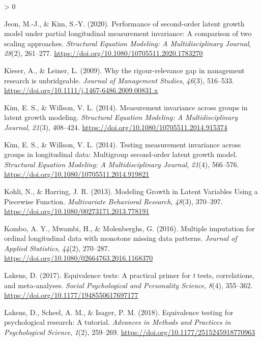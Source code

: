 \documentclass[
12pt, %
twoside,
english]{guelphthesis}
\newlength{\cslhangindent}
\newenvironment{CSLReferences}[2] %
 {%
  \setlength{\parindent}{0pt}
  \ifodd #1 \everypar{\setlength{\hangindent}{\cslhangindent}}\ignorespaces\fi
  \ifnum #2 > 0
  \setlength{\parskip}{\linespacing{2}}
  \fi
 }%
 {}
\begin{document}
\begin{CSLReferences}{1}{0}
\leavevmode{}%
Jeon, M.-J., \& Kim, S.-Y. (2020). Performance of second-order latent growth model under partial longitudinal measurement invariance: A comparison of two scaling approaches. \emph{Structural Equation Modeling: A Multidisciplinary Journal}, \emph{28}(2), 261--277. \url{https://doi.org/10.1080/10705511.2020.1783270}

\leavevmode{}%
Kieser, A., \& Leiner, L. (2009). Why the rigour-relevance gap in nanagement research is unbridgeable. \emph{Journal of Management Studies}, \emph{46}(3), 516--533. \url{https://doi.org/10.1111/j.1467-6486.2009.00831.x}

\leavevmode{}%
Kim, E. S., \& Willson, V. L. (2014). Measurement invariance across groups in latent growth modeling. \emph{Structural Equation Modeling: A Multidisciplinary Journal}, \emph{21}(3), 408--424. \url{https://doi.org/10.1080/10705511.2014.915374}

\leavevmode{}%
Kim, E. S., \& Willson, V. L. (2014). Testing measurement invariance across groups in longitudinal data: Multigroup second-order latent growth model. \emph{Structural Equation Modeling: A Multidisciplinary Journal}, \emph{21}(4), 566--576. \url{https://doi.org/10.1080/10705511.2014.919821}

\leavevmode{}%
Kohli, N., \& Harring, J. R. (2013). Modeling Growth in Latent Variables Using a Piecewise Function. \emph{Multivariate Behavioral Research}, \emph{48}(3), 370--397. \url{https://doi.org/10.1080/00273171.2013.778191}

\leavevmode{}%
Kombo, A. Y., Mwambi, H., \& Molenberghs, G. (2016). Multiple imputation for ordinal longitudinal data with monotone missing data patterns. \emph{Journal of Applied Statistics}, \emph{44}(2), 270--287. \url{https://doi.org/10.1080/02664763.2016.1168370}

\leavevmode{}%
Lakens, D. (2017). Equivalence tests: A practical primer for \emph{t} tests, correlations, and meta-analyses. \emph{Social Psychological and Personality Science}, \emph{8}(4), 355--362. \url{https://doi.org/10.1177/1948550617697177}

\leavevmode{}%
Lakens, D., Scheel, A. M., \& Isager, P. M. (2018). Equivalence testing for psychological research: A tutorial. \emph{Advances in Methods and Practices in Psychological Science}, \emph{1}(2), 259--269. \url{https://doi.org/10.1177/2515245918770963}


\end{CSLReferences}
\end{document}
